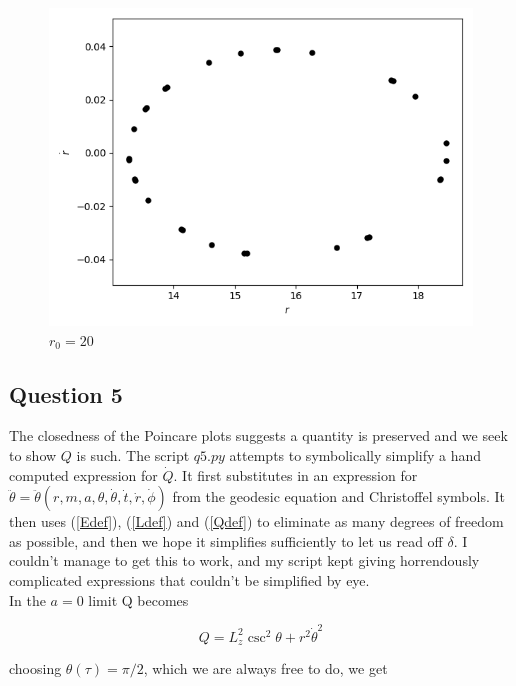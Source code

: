 \documentclass[10pt,a4paper]{report}
\begin{document}
\begin{figure}[!ht]
\begin{minipage}[b]{0.5\linewidth}
\centering
\includegraphics[width=\textwidth]{4/r0=12.png}
\caption{$r_0=20$}
\label{fig:figure1}
\end{minipage}
\end{figure}




\subsection*{Question 5}
The closedness of the Poincare plots suggests a quantity is preserved and we seek to show $Q$ is such. The script $q5.py$ attempts to symbolically simplify a hand computed expression for $\dot{Q}$. It first substitutes in an expression for $\ddot{\theta} = \ddot{\theta}(r,m,a,\theta,\dot{\theta}, \dot{t}, \dot{r},\dot{\phi})$ from the geodesic equation and Christoffel symbols. It then uses (\ref{Edef}), (\ref{Ldef}) and (\ref{Qdef}) to eliminate as many degrees of freedom as possible, and then we hope it simplifies sufficiently to let us read off $\delta$. I couldn't manage to get this to work, and my script kept giving horrendously complicated expressions that couldn't be simplified by eye.\\

In the $a=0$ limit Q becomes

\begin{equation*}
Q = L_z^2\csc^2{\theta} + r^2\dot{\theta}^2
\end{equation*}

choosing $\theta(\tau) = \pi/2$, which we are always free to do, we get 
\end{document}

